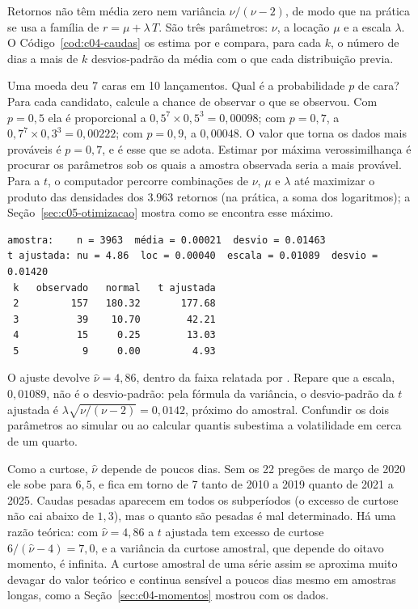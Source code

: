 Retornos não têm média zero nem variância $\nu/(\nu-2)$, de modo que na prática se usa a família de  $r = \mu + \lambda\,T$. São três parâmetros: $\nu$, a locação $\mu$ e a escala $\lambda$. O Código~\ref{cod:c04-caudas} os estima por  e compara, para cada $k$, o número de dias a mais de $k$ desvios-padrão da média com o que cada distribuição previa.

\begin{intuicao}
Uma moeda deu 7 caras em 10 lançamentos. Qual é a probabilidade $p$ de cara? Para cada candidato, calcule a chance de observar o que se observou. Com $p = 0,5$ ela é proporcional a $0,5^7 \times 0,5^3 = 0,00098$; com $p = 0,7$, a $0,7^7 \times 0,3^3 = 0,00222$; com $p = 0,9$, a $0,00048$. O valor que torna os dados mais prováveis é $p = 0,7$, e é esse que se adota. Estimar por máxima verossimilhança é procurar os parâmetros sob os quais a amostra observada seria a mais provável. Para a $t$, o computador percorre combinações de $\nu$, $\mu$ e $\lambda$ até maximizar o produto das densidades dos $3.963$ retornos (na prática, a soma dos logaritmos); a Seção~\ref{sec:c05-otimizacao} mostra como se encontra esse máximo.
\end{intuicao}


\begin{lstlisting}[style=saida]
amostra:    n = 3963  média = 0.00021  desvio = 0.01463
t ajustada: nu = 4.86  loc = 0.00040  escala = 0.01089  desvio = 0.01420
 k   observado   normal   t ajustada
 2         157   180.32       177.68
 3          39    10.70        42.21
 4          15     0.25        13.03
 5           9     0.00         4.93
\end{lstlisting}

O ajuste devolve $\hat\nu = 4,86$, dentro da faixa relatada por \citet{cont2001}. Repare que a escala, $0,01089$, não é o desvio-padrão: pela fórmula da variância, o desvio-padrão da $t$ ajustada é $\lambda\sqrt{\nu/(\nu-2)} = 0,0142$, próximo do amostral. Confundir os dois parâmetros ao simular ou ao calcular quantis subestima a volatilidade em cerca de um quarto.

Como a curtose, $\hat\nu$ depende de poucos dias. Sem os 22 pregões de março de 2020 ele sobe para $6,5$, e fica em torno de 7 tanto de 2010 a 2019 quanto de 2021 a 2025. Caudas pesadas aparecem em todos os subperíodos (o excesso de curtose não cai abaixo de $1,3$), mas o quanto são pesadas é mal determinado. Há uma razão teórica: com $\hat\nu = 4,86$ a $t$ ajustada tem excesso de curtose $6/(\hat\nu - 4) = 7,0$, e a variância da curtose amostral, que depende do oitavo momento, é infinita. A curtose amostral de uma série assim se aproxima muito devagar do valor teórico e continua sensível a poucos dias mesmo em amostras longas, como a Seção~\ref{sec:c04-momentos} mostrou com os dados.

